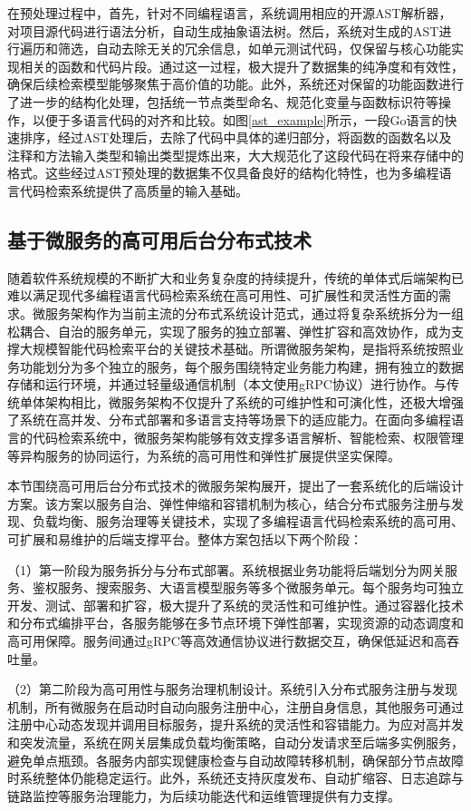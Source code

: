 \documentclass[UTF8,a4paper,12pt]{ctexart}
\numberwithin{equation}{section}
\begin{document}
在预处理过程中，首先，针对不同编程语言，系统调用相应的开源AST解析器，对项目源代码进行语法分析，自动生成抽象语法树。然后，系统对生成的AST进行遍历和筛选，自动去除无关的冗余信息，如单元测试代码，仅保留与核心功能实现相关的函数和代码片段。通过这一过程，极大提升了数据集的纯净度和有效性，确保后续检索模型能够聚焦于高价值的功能。此外，系统还对保留的功能函数进行了进一步的结构化处理，包括统一节点类型命名、规范化变量与函数标识符等操作，以便于多语言代码的对齐和比较。如图\ref{ast_example}所示，一段Go语言的快速排序，经过AST处理后，去除了代码中具体的递归部分，将函数的函数名以及注释和方法输入类型和输出类型提炼出来，大大规范化了这段代码在将来存储中的格式。这些经过AST预处理的数据集不仅具备良好的结构化特性，也为多编程语言代码检索系统提供了高质量的输入基础。\par
\subsection{基于微服务的高可用后台分布式技术}
随着软件系统规模的不断扩大和业务复杂度的持续提升，传统的单体式后端架构已难以满足现代多编程语言代码检索系统在高可用性、可扩展性和灵活性方面的需求。微服务架构作为当前主流的分布式系统设计范式，通过将复杂系统拆分为一组松耦合、自治的服务单元，实现了服务的独立部署、弹性扩容和高效协作，成为支撑大规模智能代码检索平台的关键技术基础。所谓微服务架构，是指将系统按照业务功能划分为多个独立的服务，每个服务围绕特定业务能力构建，拥有独立的数据存储和运行环境，并通过轻量级通信机制（本文使用gRPC协议）进行协作。与传统单体架构相比，微服务架构不仅提升了系统的可维护性和可演化性，还极大增强了系统在高并发、分布式部署和多语言支持等场景下的适应能力。在面向多编程语言的代码检索系统中，微服务架构能够有效支撑多语言解析、智能检索、权限管理等异构服务的协同运行，为系统的高可用性和弹性扩展提供坚实保障。\par
本节围绕高可用后台分布式技术的微服务架构展开，提出了一套系统化的后端设计方案。该方案以服务自治、弹性伸缩和容错机制为核心，结合分布式服务注册与发现、负载均衡、服务治理等关键技术，实现了多编程语言代码检索系统的高可用、可扩展和易维护的后端支撑平台。整体方案包括以下两个阶段：\par
（1）第一阶段为服务拆分与分布式部署。系统根据业务功能将后端划分为网关服务、鉴权服务、搜索服务、大语言模型服务等多个微服务单元。每个服务均可独立开发、测试、部署和扩容，极大提升了系统的灵活性和可维护性。通过容器化技术和分布式编排平台，各服务能够在多节点环境下弹性部署，实现资源的动态调度和高可用保障。服务间通过gRPC等高效通信协议进行数据交互，确保低延迟和高吞吐量。\par
（2）第二阶段为高可用性与服务治理机制设计。系统引入分布式服务注册与发现机制，所有微服务在启动时自动向服务注册中心，注册自身信息，其他服务可通过注册中心动态发现并调用目标服务，提升系统的灵活性和容错能力。为应对高并发和突发流量，系统在网关层集成负载均衡策略，自动分发请求至后端多实例服务，避免单点瓶颈。各服务内部实现健康检查与自动故障转移机制，确保部分节点故障时系统整体仍能稳定运行。此外，系统还支持灰度发布、自动扩缩容、日志追踪与链路监控等服务治理能力，为后续功能迭代和运维管理提供有力支撑。\par
\end{document}
